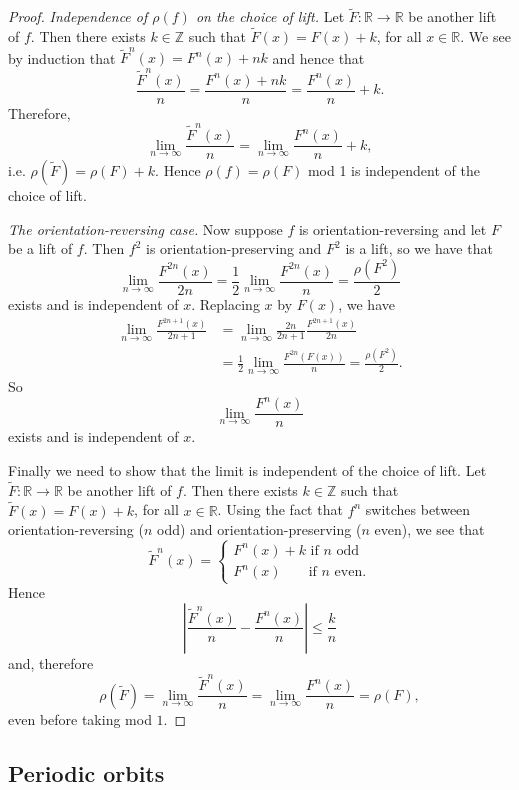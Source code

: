 \documentclass[12pt]{article}
\theoremstyle{definition}
\theoremstyle{remark}
\begin{document}
\begin{proof}
\medskip
\noindent
{\it Independence of $\rho(f)$ on the choice of lift.}
Let $\tilde F : \mathbb R \to \mathbb R$ be another lift of $f$. Then there exists $k \in \mathbb Z$ such that
$\tilde F(x) = F(x)+k$, for all $x \in \mathbb R$.
We see by induction that
$\tilde F^n(x) = F^n(x)+nk$
and hence that
\[
\frac{\tilde F^n(x)}{n}= \frac{F^n(x)+nk}{n}
= \frac{F^n(x)}{n} +k.
\]
Therefore,
\[
\lim_{n \to \infty} \frac{\tilde F^n(x)}{n}
= \lim_{n \to \infty} \frac{F^n(x)}{n} +k,
\]
i.e. $\rho(\tilde F)=\rho(F) + k$. Hence $\rho(f)=\rho(F)$ mod 1 is independent of the choice of lift.

\medskip
\noindent
{\it The orientation-reversing case.}
Now suppose $f$ is orientation-reversing and let $F$ be a lift of $f$. Then $f^2$ is orientation-preserving and $F^2$ is a lift, so we have that
\[
\lim_{n \to \infty} \frac{F^{2n}(x)}{2n} = \frac{1}{2}\lim_{n \to \infty} \frac{F^{2n}(x)}{n}
= \frac{\rho(F^2)}{2}
\]
exists and is independent of $x$.
Replacing $x$ by $F(x)$, we have
\begin{align*}
\lim_{n \to \infty} \frac{F^{2n+1}(x)}{2n+1} &= \lim_{n \to \infty} \frac{2n}{2n+1}\frac{F^{2n+1}(x)}{2n}
\\
&=
\frac{1}{2}\lim_{n \to \infty} \frac{F^{2n}(F(x))}{n} = \frac{\rho(F^2)}{2}.
\end{align*}
So 
\[
\lim_{n \to \infty} \frac{F^n(x)}{n}
\]
exists and is independent of $x$.


Finally we need to show that the limit is independent of the choice of lift.
Let $\tilde F : \mathbb R \to \mathbb R$ be another lift of $f$. Then there exists $k \in \mathbb Z$ such that
$\tilde F(x) = F(x)+k$, for all $x \in \mathbb R$.
Using the fact that $f^n$ switches between orientation-reversing ($n$ odd) and orientation-preserving ($n$ even), we see that
\[
\tilde F^n(x) = \begin{cases} F^n(x)+k \mbox{ if } n \mbox{ odd} \\
F^n(x) \quad \ \ \, \mbox{ if } n \mbox{ even}.
\end{cases}
\]
Hence
\[
\left|\frac{\tilde F^n(x)}{n}-
\frac{F^n(x)}{n}\right| \le \frac{k}{n}
\]
and, therefore
\[
\rho(\tilde F)=\lim_{n \to \infty} \frac{\tilde F^n(x)}{n}
= \lim_{n \to \infty} \frac{F^n(x)}{n} = \rho(F),
\]
even before taking mod $1$.
\end{proof}

\subsection{Periodic orbits}
\end{document}

